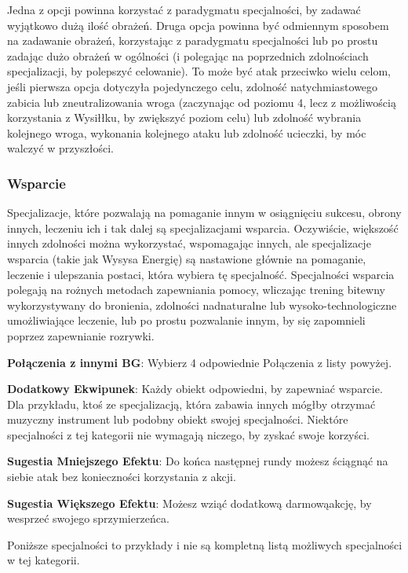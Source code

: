 Jedna z opcji powinna korzystać z paradygmatu specjalności, by zadawać wyjątkowo dużą ilość obrażeń. Druga opcja powinna być odmiennym sposobem na zadawanie obrażeń, korzystając z paradygmatu specjalności lub po prostu zadając dużo obrażeń w ogólności (i polegając na poprzednich zdolnościach specjalizacji, by polepszyć celowanie). To może być atak przeciwko wielu celom, jeśli pierwsza opcja dotyczyła pojedynczego celu, zdolność natychmiastowego zabicia lub zneutralizowania wroga (zaczynając od poziomu 4, lecz z możliwością korzystania z Wysiłłku, by zwiększyć poziom celu) lub zdolność wybrania kolejnego wroga, wykonania kolejnego ataku lub zdolność ucieczki, by móc walczyć w przyszłości.

\subsubsection{Wsparcie}

Specjalizacje, które pozwalają na pomaganie innym w osiągnięciu sukcesu, obrony innych, leczeniu ich i tak dalej są specjalizacjami wsparcia. Oczywiście, większość innych zdolności można wykorzystać, wspomagając innych, ale specjalizacje wsparcia (takie jak Wysysa Energię) są nastawione głównie na pomaganie, leczenie i ulepszania postaci, która wybiera tę specjalność. Specjalności wsparcia polegają na rożnych metodach zapewniania pomocy, wliczając trening bitewny wykorzystywany do bronienia, zdolności nadnaturalne lub wysoko-technologiczne umożliwiające leczenie, lub po prostu pozwalanie innym, by się zapomnieli poprzez zapewnianie rozrywki.

\textbf{Połączenia z innymi BG}: Wybierz 4 odpowiednie Połączenia z listy powyżej.

\textbf{Dodatkowy Ekwipunek}: Każdy obiekt odpowiedni, by zapewniać wsparcie. Dla przykładu, ktoś ze specjalizacją, która zabawia innych mógłby otrzymać muzyczny instrument lub podobny obiekt swojej specjalności. Niektóre specjalności z tej kategorii nie wymagają niczego, by zyskać swoje korzyści.

\textbf{Sugestia Mniejszego Efektu}: Do końca następnej rundy możesz ściągnąć na siebie atak bez konieczności korzystania z akcji.

\textbf{Sugestia Większego Efektu}: Możesz wziąć dodatkową darmowąakcję, by wesprzeć swojego sprzymierzeńca. 

Poniższe specjalności to przykłady i nie są kompletną listą możliwych specjalności w tej kategorii.

